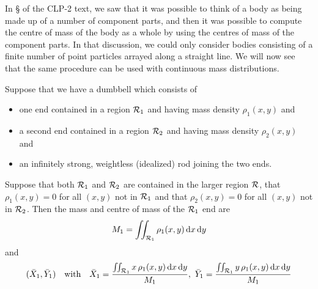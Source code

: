 \begin{eg}\label{eg_dblInt_K}
In \S {} of the CLP-2 text, we saw that it was possible
to think of a body as being made up of a number of component parts, and then it was possible to compute the centre of mass of the body as a whole by using 
the centres of mass of the component parts. In that discussion, we could 
only consider bodies consisting of a finite number of point particles 
arrayed along a straight line. We will now see that the same procedure can be used with continuous mass distributions.

Suppose that we have a dumbbell which consists of
\begin{itemize}\itemsep1pt \parskip0pt  %
\item one end contained in a region $\mathcal{R}_1$ and having mass density $\rho_1(x,y)$ and
\item a second end contained in a region $\mathcal{R}_2$ and having mass density $\rho_2(x,y)$ and
\item an infinitely strong, weightless (idealized) rod joining the two ends.
\end{itemize}
Suppose that both $\mathcal{R}_1$ and $\mathcal{R}_2$ are contained in the larger region $\mathcal{R}$,
that $\rho_1(x,y)=0$ for all $(x,y)$ not in $\mathcal{R}_1$ and that $\rho_2(x,y)=0$ for all $(x,y)$ not in $\mathcal{R}_2$.
Then the mass and centre of mass of the $\mathcal{R}_1$ end are
\begin{equation*}
M_1=\iint_{\mathcal{R}_1} \rho_1(x,y)\,\mathrm{d}x\,\mathrm{d}y
\end{equation*}
and
\begin{equation*}
(\bar X_1,\bar Y_1)\quad\text{with}\quad
\bar X_1 = \frac{\dblInt_{\cR_1} x\,\rho_1(x,y)\,\dee{x}\,\dee{y}}{M_1},\ 
\bar Y_1 = \frac{\dblInt_{\cR_1} y\,\rho_1(x,y)\,\dee{x}\,\dee{y}}{M_1}

\end{equation*}
\end{eg}
